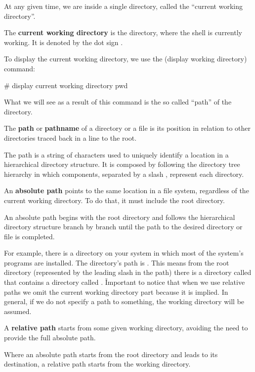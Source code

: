 
At any given time, we are inside a single directory, called the ``current working directory''.

The \textbf{current working directory} is the directory, where the shell is currently working. It is denoted by the dot
sign .
\ed

To display the current working directory, we use the  (display working directory) command:
\begin{bash}
# display current working directory
pwd
\end{bash}

What we will see as a result of this command is the so called ``path'' of the directory.

The \textbf{path} or \textbf{pathname} of a directory or a file is its position in relation to other directories traced
back in a line to the root.
\ed

The path is a string of characters used to uniquely identify a location in a hierarchical directory structure. It is
composed by following the directory tree hierarchy in which components, separated by a slash \code{/}, represent each
directory.

An \textbf{absolute path} points to the same location in a file system, regardless of the current working directory.
To do that, it must include the root directory.
\ed

An absolute path begins with the root directory and follows the hierarchical directory structure branch by branch
until the path to the desired directory or file is completed.

\be
For example, there is a directory on your system in which most of the system's programs are installed. The directory's
path is . This means from the root directory (represented by the leading slash in the path) there is
a directory called  that contains a directory called . \v

Important to notice that when we use relative paths we omit the current working directory  part because it is
implied. In general, if we do not specify a path to something, the working directory will be assumed.
\ee

A \textbf{relative path} starts from some given working directory, avoiding the need to provide the full absolute path.
\ed

Where an absolute path starts from the root directory and leads to its destination, a relative path starts from the
working directory.

